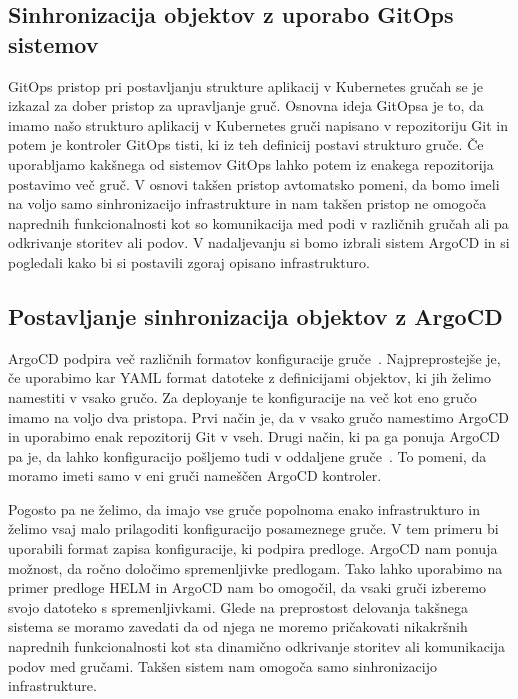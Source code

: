 \documentclass[a4paper, 12pt]{book}
\begin{document}
\subsection{Sinhronizacija objektov z uporabo GitOps sistemov}
GitOps pristop pri postavljanju strukture aplikacij v Kubernetes gručah se je izkazal za dober pristop za upravljanje gruč.
Osnovna ideja GitOpsa je to, da imamo našo strukturo aplikacij v Kubernetes gruči napisano v repozitoriju Git in potem je kontroler GitOps tisti, ki iz teh definicij postavi strukturo gruče.
Če uporabljamo kakšnega od sistemov GitOps lahko potem iz enakega repozitorija postavimo več gruč.
V osnovi takšen pristop avtomatsko pomeni, da bomo imeli na voljo samo sinhronizacijo infrastrukture in nam takšen pristop ne omogoča naprednih funkcionalnosti kot so komunikacija med podi v različnih gručah ali pa odkrivanje storitev ali podov.
V nadaljevanju si bomo izbrali sistem ArgoCD in si pogledali kako bi si postavili zgoraj opisano infrastrukturo.
\subsection{Postavljanje sinhronizacija objektov z ArgoCD}
ArgoCD podpira več različnih formatov konfiguracije gruče~\cite{argocd-docs}.
Najpreprostejše je, če uporabimo kar YAML format datoteke z definicijami objektov, ki jih želimo namestiti v vsako gručo.
Za deployanje te konfiguracije na več kot eno gručo imamo na voljo dva pristopa.
Prvi način je, da v vsako gručo namestimo ArgoCD in uporabimo enak repozitorij Git v vseh.
Drugi način, ki pa ga ponuja ArgoCD pa je, da lahko konfiguracijo pošljemo tudi v oddaljene gruče~\cite{declarative-setup}. To pomeni, da moramo imeti samo v eni gruči nameščen ArgoCD kontroler.

Pogosto pa ne želimo, da imajo vse gruče popolnoma enako infrastrukturo in želimo vsaj malo prilagoditi konfiguracijo posameznege gruče.
V tem primeru bi uporabili format zapisa konfiguracije, ki podpira predloge.
ArgoCD nam ponuja možnost, da ročno določimo spremenljivke predlogam.
Tako lahko uporabimo na primer predloge HELM in ArgoCD nam bo omogočil, da vsaki gruči izberemo svojo datoteko s spremenljivkami.
Glede na preprostost delovanja takšnega sistema se moramo zavedati da od njega ne moremo pričakovati nikakršnih naprednih funkcionalnosti kot sta dinamično odkrivanje storitev ali komunikacija podov med gručami.
Takšen sistem nam omogoča samo sinhronizacijo infrastrukture.
\end{document}
